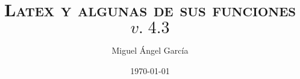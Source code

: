 \documentclass[11pt]{article}%
\title{\huge \scshape Latex y algunas de sus funciones\\ $v.\;4.3$ \vspace{30pt}}
\author{Miguel Ángel García}
\date{\today}
\begin{document}
	
	\onehalfspacing %
	
	\maketitle
	\tableofcontents %
	\newpage
	
	\setlength{\parskip}{\baselineskip}%
	
		
	
	
	
	
\end{document}
